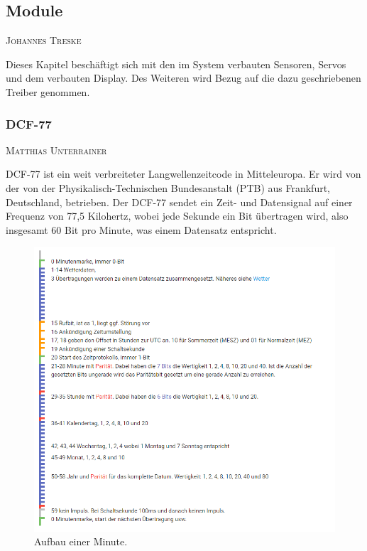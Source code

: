 \documentclass[12pt,a4paper,bibliography=totocnumbered,listof=totocnumbered]{article}
\makeatletter
\newcommand{\chapterauthor}[1]{%
  {\parindent0pt\vspace*{-5pt}%
  \linespread{1.1}\small\scshape#1%
  \par\nobreak\vspace*{3pt}}
  \@afterheading%
}
\makeatother
\begin{document}


\subsection{Module}
\chapterauthor{Johannes Treske}
Dieses Kapitel beschäftigt sich mit den im System verbauten Sensoren, Servos und dem verbauten Display.
Des Weiteren wird Bezug auf die dazu geschriebenen Treiber genommen.



\subsubsection{DCF-77}
\chapterauthor{Matthias Unterrainer}
DCF-77 ist ein weit verbreiteter Langwellenzeitcode in Mitteleuropa. Er wird von der von der Physikalisch-Technischen Bundesanstalt (PTB) aus Frankfurt, Deutschland, betrieben. Der DCF-77 sendet ein Zeit- und Datensignal auf einer Frequenz von 77,5 Kilohertz, wobei jede Sekunde ein Bit übertragen wird, also insgesamt 60 Bit pro Minute, was einem Datensatz entspricht. \cite{dcf77_logs}
\begin{figure}[htpb] %
    \centering
    \includegraphics[width=15cm,keepaspectratio=true]{pics/dcf77_minute.png}
    \caption{Aufbau einer Minute. \cite{dcf77_logs}}
    \label{fig:dcf77_minute}
\end{figure}
\end{document}
